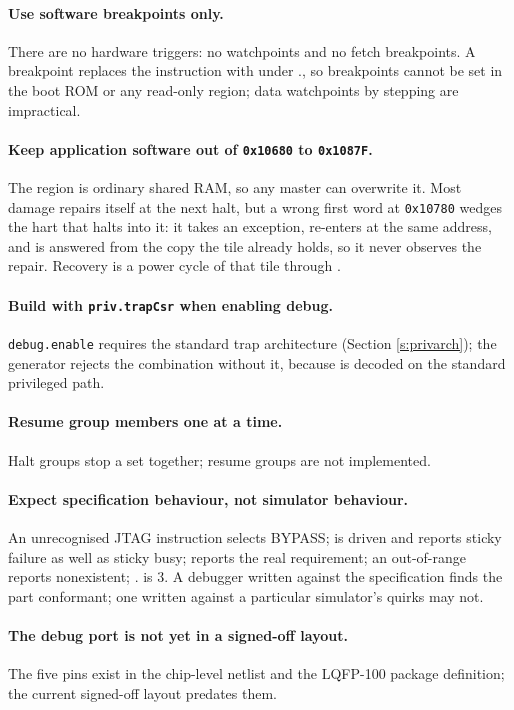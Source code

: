 \paragraph{Use software breakpoints only.} There are no hardware triggers: no watchpoints and no fetch breakpoints. A breakpoint replaces the instruction with  under ., so breakpoints cannot be set in the boot ROM or any read-only region; data watchpoints by stepping are impractical.

\paragraph{Keep application software out of \texttt{0x10680} to \texttt{0x1087F}.} The region is ordinary shared RAM, so any master can overwrite it. Most damage repairs itself at the next halt, but a wrong first word at \texttt{0x10780} wedges the hart that halts into it: it takes an exception, re-enters at the same address, and is answered from the copy the tile already holds, so it never observes the repair. Recovery is a power cycle of that tile through .

\paragraph{Build with \texttt{priv.trapCsr} when enabling debug.} \texttt{debug.enable} requires the standard trap architecture (Section \ref{s:privarch}); the generator rejects the combination without it, because  is decoded on the standard privileged path.

\paragraph{Resume group members one at a time.} Halt groups stop a set together; resume groups are not implemented.

\paragraph{Expect specification behaviour, not simulator behaviour.} An unrecognised JTAG instruction selects BYPASS;  is driven and reports sticky failure as well as sticky busy;  reports the real requirement; an out-of-range  reports nonexistent; . is 3. A debugger written against the specification finds the part conformant; one written against a particular simulator's quirks may not.

\paragraph{The debug port is not yet in a signed-off layout.} The five pins exist in the chip-level netlist and the LQFP-100 package definition; the current signed-off layout predates them.

\fi
